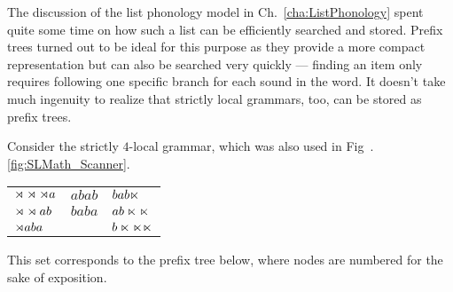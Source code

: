 The discussion of the list phonology model in Ch.~\ref{cha:ListPhonology} spent quite some time on how such a list can be efficiently searched and stored.
Prefix trees turned out to be ideal for this purpose as they provide a more compact representation but can also be searched very quickly --- finding an item only requires following one specific branch for each sound in the word.
It doesn't take much ingenuity to realize that strictly local grammars, too, can be stored as prefix trees.
%
\begin{examplebox}
    Consider the strictly $4$-local grammar, which was also used in Fig~.\ref{fig:SLMath_Scanner}.
    \label{ex:SLImplement_PrefixTree}
    \begin{center}
        \begin{tabular}{lll}
            $\rtimes \rtimes \rtimes a$
            &
            $a b a b$
            &
            $b a b \ltimes$
            \\
            $\rtimes \rtimes a b$
            &
            $b a b a$
            &
            $a b \ltimes \ltimes$
            \\
            $\rtimes a b a$
            &
            &
            $b \ltimes \ltimes \ltimes$
        \end{tabular}
    \end{center}
    This set corresponds to the prefix tree below, where nodes are numbered for the sake of exposition.
    

\end{examplebox}
